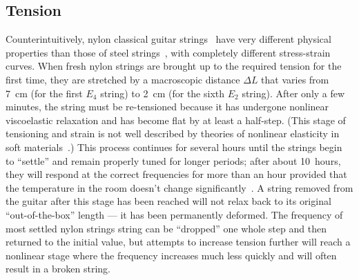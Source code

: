

 \subsection{Tension\label{sct:model_tension}}
Counterintuitively, nylon classical guitar strings~\cite{ref:blanc1996nvb,ref:lynchaird2017mpn,ref:lynchaird2018cmp} have very different physical properties than those of steel strings~\cite{ref:grimes2014stp,ref:kemp2017puw,ref:kemp2020ibg}, with completely different stress-strain curves. When fresh nylon strings are brought up to the required tension for the first time, they are stretched by a macroscopic distance $\Delta L$ that varies from 7~cm (for the first $E_4$ string) to 2~cm (for the sixth $E_2$ string). After only a few minutes, the string must be re-tensioned because it has undergone nonlinear viscoelastic relaxation and has become flat by at least a half-step. (This stage of tensioning and strain is not well described by theories of nonlinear elasticity in soft materials~\cite{ref:mihai2017hcn}.) This process continues for several hours until the strings begin to ``settle'' and remain properly tuned for longer periods; after about 10~hours, they will respond at the correct frequencies for more than an hour provided that the temperature in the room doesn't change significantly~\cite{ref:blanc1996nvb,ref:lynchaird2017mpn}. A string removed from the guitar after this stage has been reached will not relax back to its original ``out-of-the-box'' length --- it has been permanently deformed. The frequency of most settled nylon strings string can be ``dropped'' one whole step and then returned to the initial value, but attempts to increase tension further will reach a nonlinear stage where the frequency increases much less quickly and will often result in a broken string.

